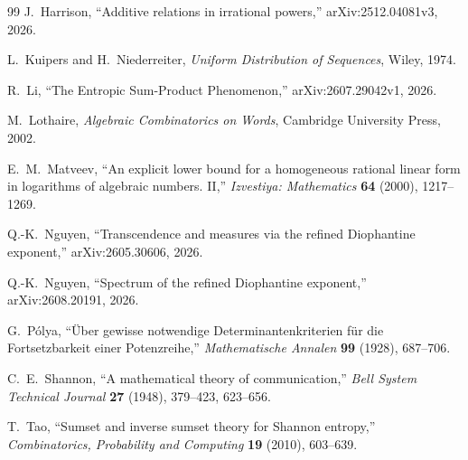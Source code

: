 \documentclass[11pt,oneside]{article}
\theoremstyle{definition}
\theoremstyle{remark}
\begin{document}
\begin{thebibliography}{99}
J.~Harrison,
``Additive relations in irrational powers,''
arXiv:2512.04081v3, 2026.

L.~Kuipers and H.~Niederreiter,
\emph{Uniform Distribution of Sequences},
Wiley, 1974.

R.~Li,
``The Entropic Sum-Product Phenomenon,''
arXiv:2607.29042v1, 2026.

M.~Lothaire,
\emph{Algebraic Combinatorics on Words},
Cambridge University Press, 2002.

E.~M.~Matveev,
``An explicit lower bound for a homogeneous rational linear form in logarithms of algebraic numbers. II,''
\emph{Izvestiya: Mathematics} \textbf{64} (2000), 1217--1269.

Q.-K.~Nguyen,
``Transcendence and measures via the refined Diophantine exponent,''
arXiv:2605.30606, 2026.

Q.-K.~Nguyen,
``Spectrum of the refined Diophantine exponent,''
arXiv:2608.20191, 2026.

G.~P\'olya,
``\"Uber gewisse notwendige Determinantenkriterien f\"ur die Fortsetzbarkeit einer Potenzreihe,''
\emph{Mathematische Annalen} \textbf{99} (1928), 687--706.

C.~E.~Shannon,
``A mathematical theory of communication,''
\emph{Bell System Technical Journal} \textbf{27} (1948), 379--423, 623--656.

T.~Tao,
``Sumset and inverse sumset theory for Shannon entropy,''
\emph{Combinatorics, Probability and Computing} \textbf{19} (2010), 603--639.

\end{thebibliography}
\end{document}
